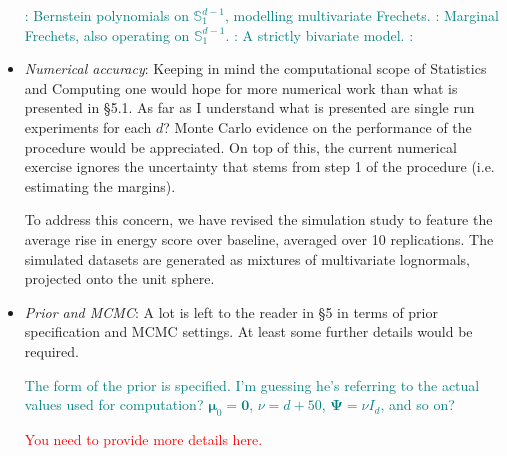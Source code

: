 \documentclass[10pt]{article}
\newcommand{\comment}[1]{\textcolor{teal}{#1}}
\newcommand{\bruno}[1]{\textcolor{red}{#1}}
\begin{document}
\begin{itemize}
    \comment{\cite{Hanson2017}: Bernstein polynomials on $\mathbb{S}_1^{d-1}$, 
    modelling multivariate Frechets.  \cite{boldi2007}: Marginal Frechets, also 
    operating on $\mathbb{S}_1^{d-1}$.  \cite{guillotte2011}: A strictly bivariate model.  
    \cite{SaNa2014}: }

\item \emph{Numerical accuracy}:  Keeping in mind the computational scope of 
    Statistics and Computing one would hope for more numerical work than what is 
    presented in §5.1. As far as I understand what is presented are single run 
    experiments for each $d$? Monte Carlo evidence on the performance of the 
    procedure would be appreciated. On top of this, the current numerical exercise
    ignores the uncertainty that stems from step 1 of the procedure 
    (i.e. estimating the margins).

To address this concern, we have revised the simulation study to feature the 
    average rise in energy score over baseline, averaged over 10 replications.  
    The simulated datasets are generated as mixtures of multivariate lognormals, 
    projected onto the unit sphere.
    

    


\item \emph{Prior and MCMC}: A lot is left to the reader in §5 in terms of
    prior specification and MCMC settings.  At least some further details would 
    be required.

    \comment{The form of the prior is specified.  I'm guessing he's referring to 
    the actual values used for computation?  $\bm{\mu}_0 = \bm{0}$, 
    $\nu = d + 50$, $\bm{\Psi} = \nu I_d$, and so on?}
    
    \bruno{You need to provide more details here.}


\end{itemize}
\end{document}
